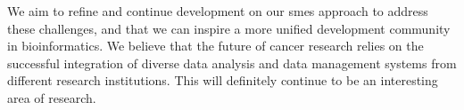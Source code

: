 We aim to refine and continue development on our \glspl{sme} approach to address
these challenges, and that we can inspire a more unified development community
in bioinformatics. We believe that the future of cancer research relies on the
successful integration of diverse data analysis and data management systems from
different research institutions.  This will definitely continue to be an
interesting area of research.


